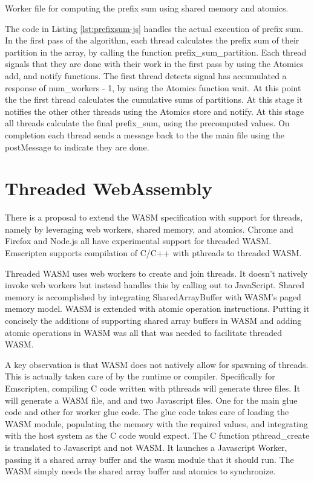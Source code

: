 \documentclass[11pt]{book}
\begin{document}
\begin{listing}[H]    
\inputminted[fontsize=\small,baselinestretch=0.5,linenos]{javascript}{code/shared/prefix_sum.js}
        \caption{Worker file for computing the prefix sum using shared memory and atomics.}    
        \label{lst:prefixsum-js}    
\end{listing}    


The code in Listing \ref{lst:prefixsum-js} handles the actual execution of prefix sum. In the first pass of the algorithm, each thread calculates the prefix sum of their partition in the array, by calling the function prefix\_sum\_partition. Each thread signals that they are done with their work in the first pass by using the Atomics add, and notify functions. The first thread detects signal has accumulated a response of num\_workers - 1, by using the Atomics function wait. At this point the the first thread calculates the cumulative sums of partitions. At this stage it notifies the other other threads using the Atomics store and notify. At this stage all threads calculate the final prefix\_sum, using the precomputed values. On completion each thread sends a message back to the the main file using the postMessage to indicate they are done. 




\section{Threaded WebAssembly}
There is a proposal to extend the WASM specification with support for threads, namely by leveraging web workers, shared memory, and atomics. Chrome and Firefox and Node.js all have experimental support for threaded WASM. Emscripten supports compilation of C/C++ with pthreads to threaded WASM.

Threaded WASM uses web workers to create and join threads. It doesn't natively invoke web workers but instead handles this by calling out to JavaScript. Shared memory is accomplished by integrating SharedArrayBuffer with WASM's paged memory model. WASM is extended with atomic operation instructions. Putting it concisely the additions of supporting shared array buffers in WASM and adding atomic operations in WASM was all that was needed to facilitate threaded WASM.

A key observation is that WASM does not natively allow for spawning of threads. This is actually taken care of by the runtime or compiler. Specifically for Emscripten, compiling C code written with pthreads will generate three files. It will generate a WASM file, and and two Javascript files. One for the main glue code and other for worker glue code. The glue code takes care of loading the WASM module, populating the memory with the required values, and integrating with the host system as the C code would expect. The C function pthread\_create is translated to Javascript and not WASM. It launches a Javascript Worker, passing it a shared array buffer and the wasm module that it should run. The WASM simply needs the shared array buffer and atomics to synchronize.  
\end{document}
